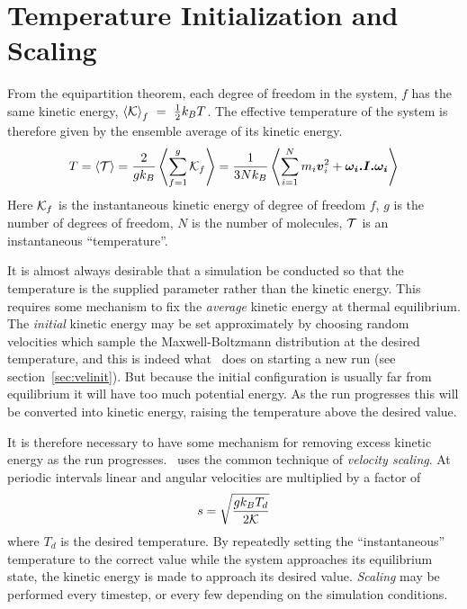 \section{Temperature Initialization and Scaling}%
\label{sec:rescaling}

From the equipartition theorem, each degree of freedom in the
system, $f$ has the same kinetic energy, $\left < {\cal K} \right >_f~=~\frac{1}{2}k_BT$.  The
effective temperature of the system is therefore given by the ensemble
average of its kinetic energy.
\begin{equation}
\label{eqn:equipartition}
T = \left < {\cal T} \right > = \frac{2}{gk_B}
\left < \sum_{f=1}^{g} {\cal K}_f \right > 
= \frac{1}{3Nk_B}\left < \sum_{i=1}^N  m_i \mbox{\boldmath \protect\(v\protect\)}_i^2 
+ \mbox{\boldmath \protect\(\omega_i.I. \omega_i\protect\)} \right > 
\end{equation}
Here ${\cal K}_f$ is the instantaneous kinetic energy of degree of
freedom $f$, $g$ is the number of degrees of freedom, $N$ is the
number of molecules, $\cal T$ is an instantaneous ``temperature''.

It is almost always desirable that a simulation be conducted so that
the temperature is the supplied parameter rather than the kinetic
energy.  This requires some mechanism to fix the {\em average\/} kinetic
energy at thermal equilibrium.  The {\em initial\/} kinetic energy may
be set approximately by choosing random velocities which sample the
Maxwell-Boltzmann distribution at the desired temperature, and this is
indeed what \moldy\ does on starting a new run (see
section~\ref{sec:velinit}).  But because the initial configuration is
usually far from equilibrium it will have too much potential energy.
As the run progresses this will be converted into kinetic energy,
raising the temperature above the desired value.

It is therefore necessary to have some mechanism for removing excess
kinetic energy as the run progresses.  \moldy\ uses the common
technique of {\em velocity scaling}.  At periodic intervals linear and
angular velocities are multiplied by a factor of
\begin{equation}
\label{eqn:scaling}
s = \sqrt{\frac{gk_BT_d}{2\cal K}}
\end{equation}
where $T_d$ is the desired temperature.  By repeatedly setting the
``instantaneous'' temperature to the correct value while the system
approaches its equilibrium state, the kinetic energy is made to
approach its desired value.  {\em Scaling\/} may be performed every
timestep, or every few depending on the simulation conditions.

